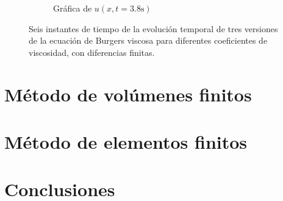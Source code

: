 \documentclass[12pt]{article}
\begin{document}
\begin{figure}[ht]
\begin{subfigure}{0.4\textwidth}
			\caption*{Gráfica de $u(x,t=3.8\unit{\second})$}
			\label{fig:vis1ddf6}
		\end{subfigure}
		\caption{Seis instantes de tiempo de la evolución temporal de tres versiones de la ecuación de Burgers viscosa para diferentes coeficientes de viscosidad, con diferencias finitas.}
		\label{fig:instantesvis1DDF}
	\end{figure}
	\section{Método de volúmenes finitos}
	\section{Método de elementos finitos}
	\section{Conclusiones}
	
	\printbibliography
	
\end{document}
